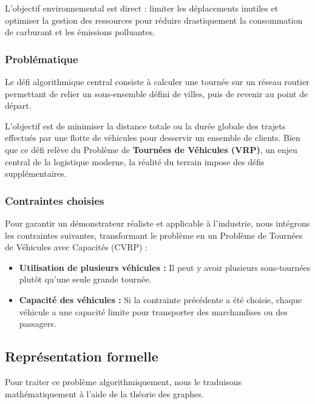 \noindent L'objectif environnemental est direct : limiter les déplacements inutiles et optimiser la gestion des ressources pour réduire drastiquement la consommation de carburant et les émissions polluantes.

\subsubsection*{Problématique}
{}

Le défi algorithmique central consiste à calculer une tournée sur un réseau routier permettant de relier un sous-ensemble défini de villes, puis de revenir au point de départ.

\noindent L’objectif est de minimiser la distance totale ou la durée globale des trajets effectués par une flotte de véhicules pour desservir un ensemble de clients. Bien que ce défi relève du Problème de \textbf{Tournées de Véhicules (VRP)}, un enjeu central de la logistique moderne, la réalité du terrain impose des défis supplémentaires.
\subsubsection*{Contraintes choisies}
{}

Pour garantir un démonstrateur réaliste et applicable à l'industrie, nous intégrons les contraintes suivantes, transformant le problème en un Problème de Tournées de Véhicules avec Capacités (CVRP) :
\begin{itemize}
    \item \textbf{Utilisation de plusieurs véhicules :} Il peut y avoir plusieurs sous-tournées plutôt qu'une seule grande tournée.
    \item \textbf{Capacité des véhicules :} Si la contrainte précédente a été choisie, chaque véhicule a une capacité limite pour transporter des marchandises ou des passagers.
\end{itemize}

\newpage

\subsection*{Représentation formelle}
{}

Pour traiter ce problème algorithmiquement, nous le traduisons mathématiquement à l'aide de la théorie des graphes.

